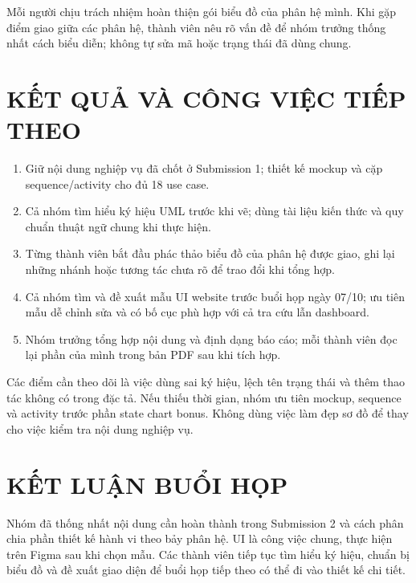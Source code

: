 \documentclass[10pt,a4paper]{article}
\begin{document}
Mỗi người chịu trách nhiệm hoàn thiện gói biểu đồ của phân hệ mình. Khi gặp điểm giao giữa các phân hệ, thành viên nêu rõ vấn đề để nhóm trưởng thống nhất cách biểu diễn; không tự sửa mã hoặc trạng thái đã dùng chung.

\section{KẾT QUẢ VÀ CÔNG VIỆC TIẾP THEO}
\begin{enumerate}
  \item Giữ nội dung nghiệp vụ đã chốt ở Submission 1; thiết kế mockup và cặp sequence/activity cho đủ 18 use case.
  \item Cả nhóm tìm hiểu ký hiệu UML trước khi vẽ; dùng tài liệu kiến thức và quy chuẩn thuật ngữ chung khi thực hiện.
  \item Từng thành viên bắt đầu phác thảo biểu đồ của phân hệ được giao, ghi lại những nhánh hoặc tương tác chưa rõ để trao đổi khi tổng hợp.
  \item Cả nhóm tìm và đề xuất mẫu UI website trước buổi họp ngày 07/10; ưu tiên mẫu dễ chỉnh sửa và có bố cục phù hợp với cả tra cứu lẫn dashboard.
  \item Nhóm trưởng tổng hợp nội dung và định dạng báo cáo; mỗi thành viên đọc lại phần của mình trong bản PDF sau khi tích hợp.
\end{enumerate}

Các điểm cần theo dõi là việc dùng sai ký hiệu, lệch tên trạng thái và thêm thao tác không có trong đặc tả. Nếu thiếu thời gian, nhóm ưu tiên mockup, sequence và activity trước phần state chart bonus. Không dùng việc làm đẹp sơ đồ để thay cho việc kiểm tra nội dung nghiệp vụ.

\section{KẾT LUẬN BUỔI HỌP}
Nhóm đã thống nhất nội dung cần hoàn thành trong Submission 2 và cách phân chia phần thiết kế hành vi theo bảy phân hệ. UI là công việc chung, thực hiện trên Figma sau khi chọn mẫu. Các thành viên tiếp tục tìm hiểu ký hiệu, chuẩn bị biểu đồ và đề xuất giao diện để buổi họp tiếp theo có thể đi vào thiết kế chi tiết.
\end{document}
